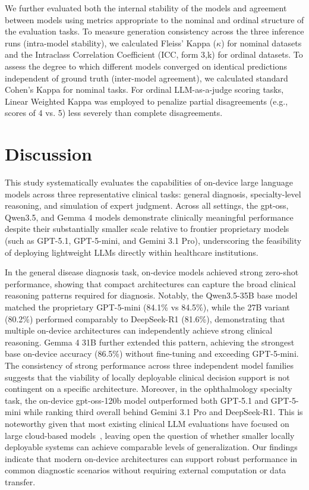 \documentclass[10pt,journal,compsoc, onecolumn]{IEEEtran}
\begin{document}
We further evaluated both the internal stability of the models and agreement between models using metrics appropriate to the nominal and ordinal structure of the evaluation tasks. To measure generation consistency across the three inference runs (intra-model stability), we calculated Fleiss’ Kappa ($\kappa$) for nominal datasets and the Intraclass Correlation Coefficient (ICC, form 3,k) for ordinal datasets. To assess the degree to which different models converged on identical predictions independent of ground truth (inter-model agreement), we calculated standard Cohen’s Kappa for nominal tasks. For ordinal LLM-as-a-judge scoring tasks, Linear Weighted Kappa was employed to penalize partial disagreements (e.g., scores of 4 vs. 5) less severely than complete disagreements.


\section*{Discussion}

This study systematically evaluates the capabilities of on-device large language models across three representative clinical tasks: general diagnosis, specialty-level reasoning, and simulation of expert judgment. Across all settings, the gpt-oss, Qwen3.5, and Gemma 4 models demonstrate clinically meaningful performance despite their substantially smaller scale relative to frontier proprietary models (such as GPT-5.1, GPT-5-mini, and Gemini 3.1 Pro), underscoring the feasibility of deploying lightweight LLMs directly within healthcare institutions.

In the general disease diagnosis task, on-device models achieved strong zero-shot performance, showing that compact architectures can capture the broad clinical reasoning patterns required for diagnosis. Notably, the Qwen3.5-35B base model matched the proprietary GPT-5-mini (84.1\% vs 84.5\%), while the 27B variant (80.2\%) performed comparably to DeepSeek-R1 (81.6\%), demonstrating that multiple on-device architectures can independently achieve strong clinical reasoning. Gemma 4 31B further extended this pattern, achieving the strongest base on-device accuracy (86.5\%) without fine-tuning and exceeding GPT-5-mini. The consistency of strong performance across three independent model families suggests that the viability of locally deployable clinical decision support is not contingent on a specific architecture. Moreover, in the ophthalmology specialty task, the on-device gpt-oss-120b model outperformed both GPT-5.1 and GPT-5-mini while ranking third overall behind Gemini 3.1 Pro and DeepSeek-R1. This is noteworthy given that most existing clinical LLM evaluations have focused on large cloud-based models~\cite{zhang2025ophthreview, bhayana2024radiology, schramm2025multimodal}, leaving open the question of whether smaller locally deployable systems can achieve comparable levels of generalization. Our findings indicate that modern on-device architectures can support robust performance in common diagnostic scenarios without requiring external computation or data transfer.
\end{document}
